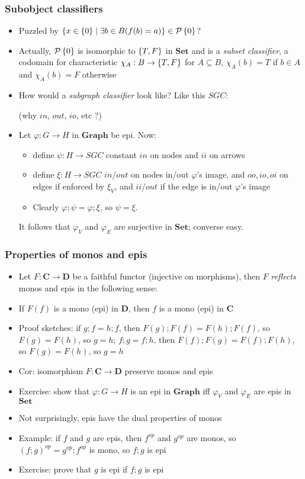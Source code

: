 \documentclass[handout]{beamer}
\newcommand{\bfsf}[1]{{\boldsymbol{#1}}}
\newcommand{\Set}{\bfsf{Set}}
\newcommand{\Gra}{\bfsf{Graph}}
\newcommand{\CC}{\bfsf{C}}
\newcommand{\DD}{\bfsf{D}}
\begin{document}
\frame
  {   
    \frametitle{Subobject classifiers}\label{Ch4:SubObj}

 \begin{itemize}[<+->]
\item Puzzled by $\{ x\in\{0\}\mid \exists b\in B (f(b)=a)\} \in \operatorname{\mathcal{P}}{\{0\}}$?
\item Actually, $\operatorname{\mathcal{P}}{\{0\}}$ is isomorphic to $\{T,F\}$ in $\Set$
and is a \emph{subset classifier}, a codomain for characteristic $\chi_A : B\to \{T,F\}$
for $A\subseteq B$, $\chi_A (b) = T$ if $b\in A$ and $\chi_A (b) = F$ otherwise
\item How would a \emph{subgraph classifier} look like? Like this $SGC$:
 (why $in$, $out$, $io$, etc ?)
\item Let $\varphi: G \to H$ in $\Gra$ be epi. Now:
 \begin{itemize}
    \item define $\psi : H\to SGC$ constant $in$ on nodes and $ii$ on arrows
    \item define $\xi : H\to SGC$ $in/out$ on nodes in/out $\varphi$'s image,
     and $oo,io,oi$ on edges if enforced by  $\xi_V$, and $ii/out$ if the edge 
     is in/out $\varphi$'s image
    \item Clearly $\varphi;\psi=\varphi;\xi$, so $\psi=\xi$.
\end{itemize}
It follows that $\varphi_V$ and  $\varphi_E$ are surjective in $\Set$; converse easy.
 \end{itemize}
 }

\frame
  {   
    \frametitle{Properties of monos and epis}\label{Ch4:MonandEp}

 \begin{itemize}[<+->]
\item Let $F: \CC\to\DD$ be a faithful functor (injective on morphisms),
then $F$ \emph{reflects} monos and epis in the following sense:
\item If $F(f)$ is a mono (epi) in $\DD$, then $f$ is a mono (epi) in $\CC$
\item Proof sketches: if $g;f=h;f$, then $F(g);F(f) = F(h); F(f)$, so $F(g)=F(h)$, so $g=h$;
$f;g=f;h$, then $F(f);F(g) =  F(f);F(h)$, so $F(g)=F(h)$, so $g=h$
\item Cor: isomorphism $F: \CC\to\DD$ preserve monos and epis
\item Exercise: show that $\varphi: G\to H$ is an epi in $\Gra$ iff
$\varphi_V$ and $\varphi_E$ are epis in $\Set$   
\item Not surprisingly, epis have the dual properties of monos
\item Example: if $f$ and $g$ are epis, then  $f^{op}$ and $g^{op}$ are monos,
so $(f;g)^{op}=g^{op} ; f^{op}$ is mono, so $f;g$ is epi
\item Exercise: prove that $g$ is epi if $f;g$ is epi
 \end{itemize}

 }
\end{document}
